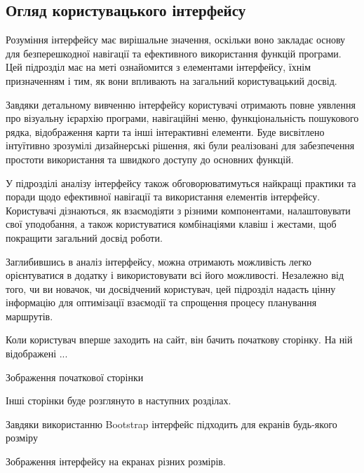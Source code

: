 \subsection{Огляд користувацького інтерфейсу}
\label{subsec:interface-subsection}

Розуміння інтерфейсу має вирішальне значення, оскільки воно закладає основу для безперешкодної навігації та ефективного використання функцій програми. Цей підрозділ має на меті ознайомится з елементами інтерфейсу, їхнім призначенням і тим, як вони впливають на загальний користувацький досвід.

Завдяки детальному вивченню інтерфейсу користувачі отримають повне уявлення про візуальну ієрархію програми, навігаційні меню, функціональність пошукового рядка, відображення карти та інші інтерактивні елементи. Буде висвітлено інтуїтивно зрозумілі дизайнерські рішення, які були реалізовані для забезпечення простоти використання та швидкого доступу до основних функцій.

У підрозділі аналізу інтерфейсу також обговорюватимуться найкращі практики та поради щодо ефективної навігації та використання елементів інтерфейсу. Користувачі дізнаються, як взаємодіяти з різними компонентами, налаштовувати свої уподобання, а також користуватися комбінаціями клавіш і жестами, щоб покращити загальний досвід роботи.

Заглибившись в аналіз інтерфейсу, можна отримають можливість легко орієнтуватися в додатку і використовувати всі його можливості. Незалежно від того, чи ви новачок, чи досвідчений користувач, цей підрозділ надасть цінну інформацію для оптимізації взаємодії та спрощення процесу планування маршрутів.

Коли користувач вперше заходить на сайт, він бачить початкову сторінку. На ній відображені ...

Зображення початкової сторінки

Інші сторінки буде розглянуто в наступних розділах.

Завдяки використанню Bootstrap інтерфейс підходить для екранів будь-якого розміру

Зображення інтерфейсу на екранах різних розмірів.